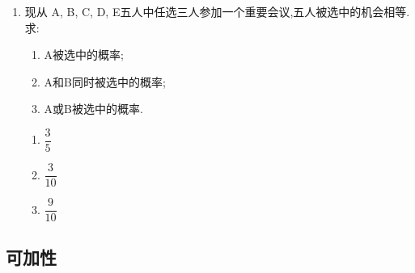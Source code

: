 \begin{enumerate}
\begin{jieda}
    \begin{enumerate}
        \item $\dfrac{3}{5}$
        \item $\dfrac{3}{5}$
        \item $\dfrac{3}{10}$
    \end{enumerate}
\end{jieda}

\item 现从 A, B, C, D, E五人中任选三人参加一个重要会议,五人被选中的机会相等.求:
\begin{enumerate}
\item A被选中的概率;
\item A和B同时被选中的概率;
\item A或B被选中的概率.
\end{enumerate}

\begin{jieda}
    \begin{enumerate}
        \item $\dfrac{3}{5}$
        \item $\dfrac{3}{10}$
        \item $\dfrac{9}{10}$
    \end{enumerate}
\end{jieda}

\end{enumerate}




\clearpage

\subsection*{可加性}


